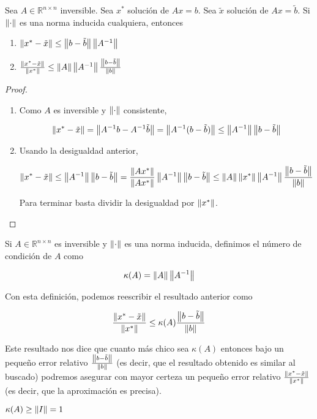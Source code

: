 \begin{propo}
Sea $A \in \mathbb{R}^{n \times n}$ inversible. Sea $x^*$ solución de $Ax = b$. Sea $\tilde{x}$ solución de $Ax = \tilde{b}$. Si $\left\lVert\cdot\right\rVert$ es una norma inducida cualquiera, entonces
\begin{enumerate}
\item $\left\lVert x^* - \tilde{x}\right\rVert \leq \left\lVert b - \tilde{b}\right\rVert \left\lVert A^{-1}\right\rVert$
\item $\frac{\left\lVert x^* - \tilde{x}\right\rVert}{\left\lVert x^*\right\rVert} \leq \left\lVert A\right\rVert \left\lVert A^{-1}\right\rVert \frac{\left\lVert b - \tilde{b}\right\rVert}{\left\lVert b\right\rVert}$
\end{enumerate}

\begin{proof}
\begin{enumerate}
\item Como $A$ es inversible y $\left\lVert\cdot\right\rVert$ consistente,

\[\left\lVert x^* - \tilde{x}\right\rVert = \left\lVert A^{-1}b - A^{-1}\tilde{b}\right\rVert = \left\lVert A^{-1}(b - \tilde{b})\right\rVert \leq \left\lVert A^{-1}\right\rVert \left\lVert b - \tilde{b}\right\rVert\]

\item Usando la desigualdad anterior,

\[\left\lVert x^* - \tilde{x}\right\rVert \leq \left\lVert A^{-1}\right\rVert \left\lVert b - \tilde{b}\right\rVert = \frac{\left\lVert Ax^*\right\rVert}{\left\lVert Ax^*\right\rVert} \left\lVert A^{-1}\right\rVert \left\lVert b - \tilde{b}\right\rVert \leq \left\lVert A\right\rVert \left\lVert x^*\right\rVert \left\lVert A^{-1}\right\rVert \frac{\left\lVert b - \tilde{b}\right\rVert}{\left\lVert b\right\rVert}\]

Para terminar basta dividir la desigualdad por $\left\lVert x^*\right\rVert$.

\end{enumerate}

\end{proof}

\end{propo}

\begin{defi}
Si $A\in \mathbb{R}^{n \times n}$ es inversible y $\left\lVert\cdot\right\rVert$ es una norma inducida, definimos el número de condición de $A$ como

\[\kappa(A) = \left\lVert A\right\rVert\left\lVert A^{-1}\right\rVert\]
\end{defi}

Con esta definición, podemos reescribir el resultado anterior como

\begin{coro}
\[\frac{\left\lVert x^* - \tilde{x}\right\rVert}{\left\lVert x^*\right\rVert} \leq \kappa(A) \frac{\left\lVert b - \tilde{b}\right\rVert}{\left\lVert b\right\rVert}\]
\end{coro}

Este resultado nos dice que cuanto más chico sea $\kappa(A)$ entonces bajo un pequeño error relativo $\frac{\left\lVert b - \tilde{b}\right\rVert}{\left\lVert b\right\rVert}$ (es decir, que el resultado obtenido es similar al buscado) podremos asegurar con mayor certeza un pequeño error relativo $\frac{\left\lVert x^* - \tilde{x}\right\rVert}{\left\lVert x^*\right\rVert}$ (es decir, que la aproximación es precisa).

\begin{obs}
$\kappa(A) \geq \left\lVert I\right\rVert = 1$
\end{obs}
